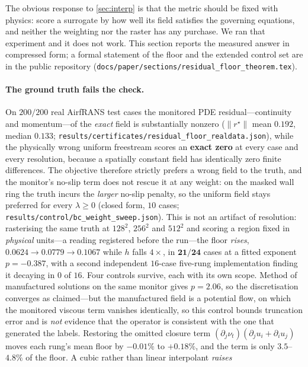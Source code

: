 The obvious response to \autoref{sec:interp} is that the metric should be fixed with
physics: score a surrogate by how well its field satisfies the governing equations, and
neither the weighting nor the raster has any purchase. We ran that experiment and it does
not work. This section reports the measured answer in compressed form; a formal statement
of the floor and the extended control set are in the public repository
(\texttt{docs\slash{}paper\slash{}sections\slash{}residual\_floor\_theorem.tex}).

\paragraph{The ground truth fails the check.} On $200/200$ real AirfRANS test cases the
monitored PDE residual---continuity and momentum---of the \emph{exact} field is
substantially nonzero ($\|r^\star\|$ mean $\mathbf{0.192}$, median $0.133$;
\texttt{results\slash{}certificates\slash{}residual\_floor\_realdata.json}), while the physically wrong
uniform freestream scores an \textbf{exact zero} at every case and every resolution,
because a spatially constant field has identically zero finite differences. The objective
therefore strictly prefers a wrong field to the truth, and the monitor's no-slip term does
not rescue it at any weight: on the masked wall ring the truth incurs the \emph{larger}
no-slip penalty, so the uniform field stays preferred for every $\lambda\ge0$ (closed form,
$10$ cases; \texttt{results\slash{}control\slash{}bc\_weight\_sweep.json}). This is not an artifact of
resolution: rasterising the same truth at $128^2$, $256^2$ and $512^2$ and scoring a
region fixed in \emph{physical} units---a reading registered before the run---the floor
\emph{rises}, $0.0624\to0.0779\to0.1067$ while $h$ falls $4\times$, in $\mathbf{21/24}$
cases at a fitted exponent $p=-0.387$, with a second independent $16$-case five-rung
implementation finding it decaying in $0$ of $16$. Four controls survive, each with its
own scope. Method of manufactured solutions on the same monitor gives $p=2.06$, so the
discretisation converges as claimed---but the manufactured field is a potential flow, on
which the monitored viscous term vanishes identically, so this control bounds truncation
error and is \emph{not} evidence that the operator is consistent with the one that
generated the labels. Restoring the omitted closure term $(\partial_j\nu_t)(\partial_j
u_i+\partial_i u_j)$ moves each rung's mean floor by $-0.01\%$ to $+0.18\%$, and the term
is only $3.5$--$4.8\%$ of the floor. A cubic rather than linear interpolant \emph{raises}

